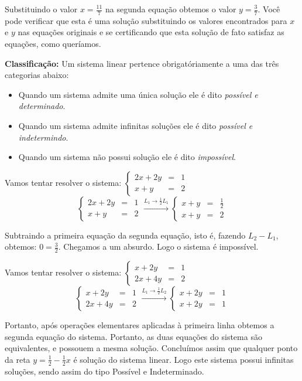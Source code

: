 \noindent Substituindo o valor $x=\frac{11}{7}$ na segunda equação obtemos o valor $y=\frac{3}{7}$. Você pode verificar que esta é uma solução
substituindo os valores encontrados para $x$ e $y$ nas equações originais e se certificando que esta solução de fato satisfaz as equações,
como queríamos.

\noindent\textbf{Classificação:} Um sistema linear pertence obrigatóriamente a uma das três categorias abaixo:
\begin{mybox} \begin{itemize}
\item Quando um sistema admite uma única solução ele é dito \textit{possível e determinado}.
\item Quando um sistema admite infinitas soluções ele é dito \textit{possível e indetermindo}.
\item Quando um sistema não possui solução ele é dito \textit{impossível}.
\end{itemize}
\end{mybox}

\begin{exemplo} Vamos tentar resolver o sistema: $\left\{ \begin{array}{rcl}
2x+2y&=&1\\
x+y&=&2
\end{array}\right.$
\smallskip{}
\[
\left\{ \begin{array}{rcl}
2x+2y&=&1\\
x+y&=&2
\end{array}\right. \xrightarrow[]{L_1\rightarrow \frac{1}{2}L_1}\left\{ \begin{array}{rcl}
x+y&=&\frac{1}{2}\\
x+y&=&2
\end{array}\right.
\]

Subtraindo a primeira equação da segunda equação, isto é, fazendo $L_2-L_1$, obtemos: $0=\frac{3}{2}$.
Chegamos a um absurdo. Logo o sistema é impossível.
\end{exemplo}


\begin{exemplo} Vamos tentar resolver o sistema: $\left\{ \begin{array}{rcl}
x+2y&=&1\\
2x+4y&=&2
\end{array}\right.$
\smallskip{}
\[
\left\{ \begin{array}{rcl}
x+2y&=&1\\
2x+4y&=&2
\end{array}\right. \xrightarrow[]{L_1\rightarrow \frac{1}{2}L_2}\left\{ \begin{array}{rcl}
x+2y&=&1\\
x+2y&=&1
\end{array}\right.
\]

Portanto, após operações elementares aplicadas à primeira linha obtemos a segunda equação do sistema. Portanto, as duas
equações do sistema são equivalentes, e possouem a mesma solução. Concluímos assim que qualquer ponto da reta $y=\frac{1}{2}-\frac{1}{2}x$
é solução do sistema linear. Logo este sistema possui infinitas soluções, sendo assim do tipo Possível e Indeterminado.
\end{exemplo}

